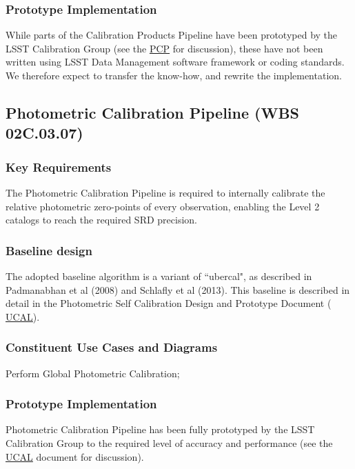 \documentclass[12pt]{article}
\newcommand{\ds}[2]{{\color{blue} \href{https://docushare.lsstcorp.org/docushare/dsweb/Get/#1}{#2}}\xspace}
\newcommand{\PCP}{\ds{Document-8123}{PCP}}
\newcommand{\UCAL}{\ds{Document-15125}{UCAL}}
\newcommand{\wbsPhotoCal}{WBS 02C.03.07}
\begin{document}
\subsubsection{Prototype Implementation}

While parts of the Calibration Products Pipeline have been prototyped by the LSST Calibration Group (see the \PCP for discussion), these have not been written using LSST Data Management software framework or coding standards. We therefore expect to transfer the know-how, and rewrite the implementation.

\clearpage

\subsection{Photometric Calibration Pipeline (\wbsPhotoCal)}

\subsubsection{Key Requirements}

The Photometric Calibration Pipeline is required to internally calibrate the relative photometric zero-points of every observation, enabling the Level 2 catalogs to reach the required SRD precision.

\subsubsection{Baseline design}

The adopted baseline algorithm is a variant of ``ubercal", as described in Padmanabhan et al (2008) and Schlafly et al (2013). This baseline is described in detail in the Photometric Self Calibration Design and Prototype Document (\UCAL).

\subsubsection{Constituent Use Cases and Diagrams}

Perform Global Photometric Calibration;

\subsubsection{Prototype Implementation}

Photometric Calibration Pipeline has been fully prototyped by the LSST Calibration Group to the required level of accuracy and performance (see the \UCAL document for discussion). %
\\
\end{document}
